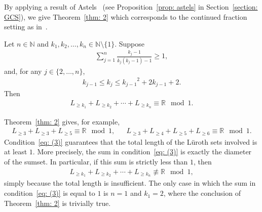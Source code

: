 \documentclass{ws-ijnt}
\begin{document}
	By applying a result of Astels~\cite[Theorem 2.4]{astels2000} (see Proposition~\ref{prop: astels} in Section~\ref{section: GCS}), we give Theorem~\ref{thm: 2} which corresponds to the continued fraction setting as in~\cite[Theorem 1.5]{astels2000}.
	\begin{theorem}\label{thm: 2}
		Let $n\in\mathbb{N}$ and $k_1,k_2,\dots,k_n\in\mathbb{N}\setminus\{1\}$. Suppose
		\begin{align}
			\label{eq: (3)}
			\sum_{j=1}^{n}\frac{k_j-1}{k_j(k_j-1)-1}\geq1,
		\end{align}
		and, for any $j\in\{2,\ldots,n\}$,
		\begin{align}
			\label{eq: (4)}
			k_{j-1}\leq k_{j}\leq {{k_{j-1}}^2+2k_{j-1}+2}.
		\end{align}
		Then 
		\begin{align*}
			L_{\geq k_1}+L_{\geq k_2}+\cdots+L_{\geq k_n}\equiv\mathbb{R}\mod1.
		\end{align*}
	\end{theorem}
	Theorem~\ref{thm: 2} gives, for example,
	\begin{align*}
		L_{\geq3}+L_{\geq3}+L_{\geq5}\equiv\mathbb{R}\mod1, && 
		L_{\geq3}+L_{\geq4}+L_{\geq5}+L_{\geq6}\equiv\mathbb{R}\mod1.
	\end{align*}
	Condition~\eqref{eq: (3)} guarantees that the total length of the L\"uroth sets involved is at least \(1\). More precisely, the sum in condition~\eqref{eq: (3)} is exactly the diameter of the sumset. In particular, if this sum is strictly less than \(1\), then
	\begin{align*}
		L_{\geq k_1} + L_{\geq k_2} + \cdots + L_{\geq k_n} \not\equiv \mathbb{R} \mod 1,
	\end{align*}
	simply because the total length is insufficient. The only case in which the sum in
	condition~\eqref{eq: (3)} is equal to \(1\) is \(n=1\) and \(k_1=2\), where the conclusion of Theorem~\ref{thm: 2} is trivially true.
	
\end{document}
